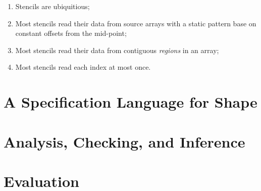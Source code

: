 \documentclass[acmlarge,review,anonymous]{acmart}\settopmatter{printfolios=true}
\begin{document}
\begin{enumerate}
\item Stencils are ubiquitious;
\item Most stencils read their data from source arrays with a static pattern
base on constant offsets from the mid-point;
\item Most stencils read their data from contiguous \emph{regions} in an array;
\item Most stencils read each index at most once.
\end{enumerate}

\section{A Specification Language for Shape}

\section{Analysis, Checking, and Inference}

\section{Evaluation}



\appendix

\end{document}
